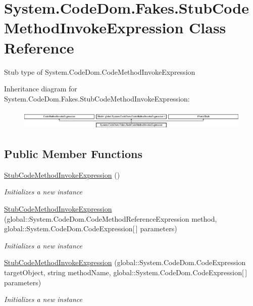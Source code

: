 \hypertarget{class_system_1_1_code_dom_1_1_fakes_1_1_stub_code_method_invoke_expression}{\section{System.\-Code\-Dom.\-Fakes.\-Stub\-Code\-Method\-Invoke\-Expression Class Reference}
\label{class_system_1_1_code_dom_1_1_fakes_1_1_stub_code_method_invoke_expression}
}


Stub type of System.\-Code\-Dom.\-Code\-Method\-Invoke\-Expression 


Inheritance diagram for System.\-Code\-Dom.\-Fakes.\-Stub\-Code\-Method\-Invoke\-Expression\-:\begin{figure}[H]
\begin{center}
\leavevmode
\includegraphics[height=0.972222cm]{class_system_1_1_code_dom_1_1_fakes_1_1_stub_code_method_invoke_expression}
\end{center}
\end{figure}
\subsection*{Public Member Functions}
\begin{DoxyCompactItemize}
\item 
\hyperlink{class_system_1_1_code_dom_1_1_fakes_1_1_stub_code_method_invoke_expression_a6e4d1b65ae45e8dfe5839567fe1b4e15}{Stub\-Code\-Method\-Invoke\-Expression} ()
\begin{DoxyCompactList}\small\item\em Initializes a new instance\end{DoxyCompactList}\item 
\hyperlink{class_system_1_1_code_dom_1_1_fakes_1_1_stub_code_method_invoke_expression_a29c55d84f27af9750eae94225a336158}{Stub\-Code\-Method\-Invoke\-Expression} (global\-::\-System.\-Code\-Dom.\-Code\-Method\-Reference\-Expression method, global\-::\-System.\-Code\-Dom.\-Code\-Expression\mbox{[}$\,$\mbox{]} parameters)
\begin{DoxyCompactList}\small\item\em Initializes a new instance\end{DoxyCompactList}\item 
\hyperlink{class_system_1_1_code_dom_1_1_fakes_1_1_stub_code_method_invoke_expression_af9788269237e328a55ee5137fa992f25}{Stub\-Code\-Method\-Invoke\-Expression} (global\-::\-System.\-Code\-Dom.\-Code\-Expression target\-Object, string method\-Name, global\-::\-System.\-Code\-Dom.\-Code\-Expression\mbox{[}$\,$\mbox{]} parameters)
\begin{DoxyCompactList}\small\item\em Initializes a new instance\end{DoxyCompactList}\end{DoxyCompactItemize}
